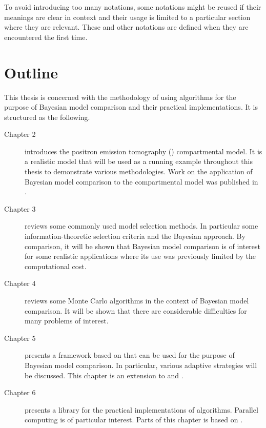 To avoid introducing too many notations, some notations might be reused if
their meanings are clear in context and their usage is limited to a
particular section where they are relevant. These and other notations are
defined when they are encountered the first time.

\section{Outline}
\label{sec:Outline}

This thesis is concerned with the methodology of using \smc algorithms for
the purpose of Bayesian model comparison and their practical implementations.
It is structured as the following.
\begin{description}
  \item[Chapter 2] introduces the positron emission tomography (\pet)
  compartmental model. It is a realistic model that will be used as a running
  example throughout this thesis to demonstrate various methodologies. Work
  on the application of Bayesian model comparison to the \pet compartmental
  model was published in \cite{Zhou2013}.
  \item[Chapter 3] reviews some commonly used model selection methods. In
  particular some information-theoretic selection criteria and the Bayesian
  approach. By comparison, it will be shown that Bayesian model comparison is
  of interest for some realistic applications where its use was previously
  limited by the computational cost.
  \item[Chapter 4] reviews some Monte Carlo algorithms in the context of
  Bayesian model comparison. It will be shown that there are considerable
  difficulties for many problems of interest.
  \item[Chapter 5] presents a framework based on \smc that can be used for
  the purpose of Bayesian model comparison. In particular, various adaptive
  strategies will be discussed. This chapter is an extension to
  \cite{Zhou:2013vx} and \cite{Zhou:2012uz}.  
  \item[Chapter 6] presents a \cpp library for the practical implementations
  of \smc algorithms. Parallel computing is of particular interest. Parts of
  this chapter is based on \cite{vsmcjss}.
\end{description}
